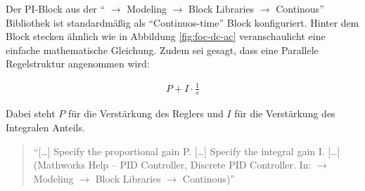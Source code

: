 Der PI-Block aus der \enquote{ $\rightarrow$ Modeling $\rightarrow$ Block Libraries $\rightarrow$ Continous} Bibliothek ist standardmäßig als \enquote{Continuos-time} Block konfiguriert.
Hinter dem Block stecken ähnlich wie in Abbildung \ref{fig:foc-dc-ac} veranschaulicht eine einfache mathematische Gleichung.
Zudem sei gesagt, dass eine Parallele Regelstruktur angenommen wird:

\begin{align}
	P + I\cdot\frac{1}{s}
\end{align}

Dabei steht $P$ für die Verstärkung des Reglers und $I$ für die Verstärkung des Integralen Anteils.

\begin{quote}
	\enquote{[\ldots] Specify the proportional gain P. [\ldots] Specify the integral gain I. [\ldots] (Mathworks Help -- PID Controller, Discrete PID Controller. In:  $\rightarrow$ Modeling $\rightarrow$ Block Libraries $\rightarrow$ Continous)}
\end{quote}

